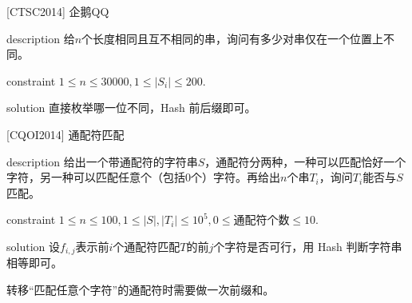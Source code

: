 \documentclass{beamer}
\theoremstyle{compact}
\def\le{\leqslant}
\begin{document}
\begin{frame}{[CTSC2014] 企鹅QQ}
	\begin{block}{description}
		给$n$个长度相同且互不相同的串，询问有多少对串仅在一个位置上不同。
	\end{block}
	\begin{block}{constraint}
		$1 \le n \le 30000, 1 \le |S_i| \le 200.$
	\end{block}
	\pause
	\begin{block}{solution}
		直接枚举哪一位不同，Hash 前后缀即可。
	\end{block}
\end{frame}
\begin{frame}{[CQOI2014] 通配符匹配}
	\begin{block}{description}
		给出一个带通配符的字符串$S$，通配符分两种，一种可以匹配恰好一个字符，另一种可以匹配任意个（包括$0$个）字符。再给出$n$个串$T_i$，询问$T_i$能否与$S$匹配。
	\end{block}
	\begin{block}{constraint}
		$1 \le n \le 100, 1 \le |S|,|T_i| \le 10^5, 0 \le $通配符个数$\le 10.$
	\end{block}
	\pause
	\begin{block}{solution}
		设$f_{i,j}$表示前$i$个通配符匹配$T$的前$j$个字符是否可行，用 Hash 判断字符串相等即可。
		
		转移“匹配任意个字符”的通配符时需要做一次前缀和。
	\end{block}
\end{frame}
\end{document}
